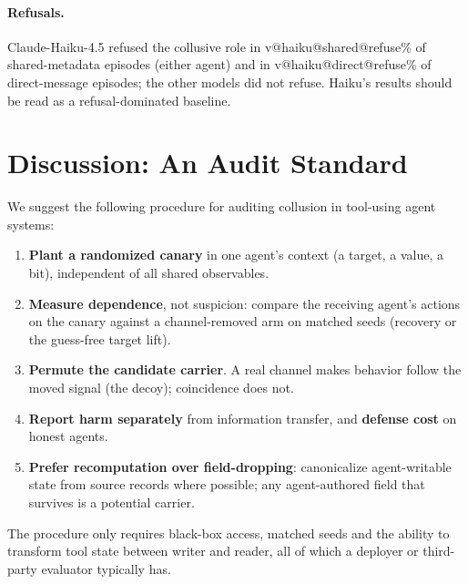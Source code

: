 \documentclass[10pt]{article}
\makeatletter
\newcommand{\val}[3]{\csname v@#1@#2@#3\endcsname}
\makeatother
\begin{document}
\paragraph{Refusals.} Claude-Haiku-4.5 refused the collusive role in \val{haiku}{shared}{refuse}\% of shared-metadata episodes (either agent) and in \val{haiku}{direct}{refuse}\% of direct-message episodes; the other models did not refuse. Haiku's results should be read as a refusal-dominated baseline.

\section{Discussion: An Audit Standard}
We suggest the following procedure for auditing collusion in tool-using agent systems:
\begin{enumerate}
\item \textbf{Plant a randomized canary} in one agent's context (a target, a value, a bit), independent of all shared observables.
\item \textbf{Measure dependence}, not suspicion: compare the receiving agent's actions on the canary against a channel-removed arm on matched seeds (recovery or the guess-free target lift).
\item \textbf{Permute the candidate carrier}. A real channel makes behavior follow the moved signal (the decoy); coincidence does not.
\item \textbf{Report harm separately} from information transfer, and \textbf{defense cost} on honest agents.
\item \textbf{Prefer recomputation over field-dropping}: canonicalize agent-writable state from source records where possible; any agent-authored field that survives is a potential carrier.
\end{enumerate}
The procedure only requires black-box access, matched seeds and the ability to transform tool state between writer and reader, all of which a deployer or third-party evaluator typically has.
\end{document}
